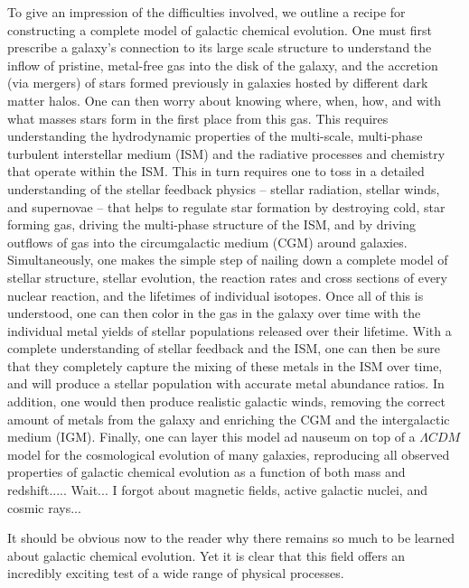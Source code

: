 To give an impression of the difficulties involved, we outline a recipe for constructing a complete model of galactic chemical evolution. One must first prescribe a galaxy's connection to its large scale structure to understand the inflow of pristine, metal-free gas into the disk of the galaxy, and the accretion (via mergers) of stars formed previously in galaxies hosted by different dark matter halos. One can then worry about knowing where, when, how, and with what masses stars form in the first place from this gas. This requires understanding the hydrodynamic
properties of the multi-scale, multi-phase turbulent interstellar medium (ISM) and the radiative processes and chemistry that operate within the ISM. This in turn requires one to toss in a detailed understanding of the stellar feedback physics -- stellar radiation, stellar winds, and supernovae -- that helps to regulate star formation by destroying cold, star forming gas, driving the multi-phase structure of the ISM, and by driving outflows of gas into the circumgalactic medium (CGM) around galaxies. Simultaneously, one makes the simple step of nailing down a complete model of stellar structure, stellar evolution, the reaction rates and cross sections of every nuclear reaction, and the lifetimes of individual isotopes. Once all of this is understood, one can then color in the gas in the galaxy over time with the individual metal yields of stellar populations released over their lifetime. With a complete understanding of stellar feedback and the ISM, one can then be sure that they completely capture the mixing of these metals in the ISM over time, and will produce a stellar population with accurate metal abundance ratios. In addition, one would then produce realistic galactic winds, removing the correct amount of metals from the galaxy and enriching the CGM and the intergalactic medium (IGM). Finally, one can layer this model ad nauseum on top of a $\Lambda CDM$ model for the cosmological evolution of many galaxies, reproducing all observed properties of galactic chemical evolution as a function of both mass and redshift..... Wait... I forgot about magnetic fields, active galactic nuclei, and cosmic rays...

It should be obvious now to the reader why there remains so much to be learned about galactic chemical evolution. Yet it is clear that this field offers an incredibly exciting test of a wide range of physical processes.

